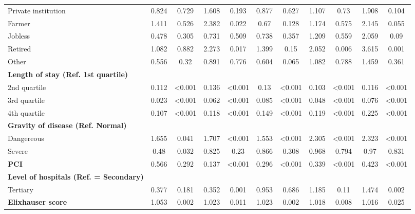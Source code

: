 \documentclass[ijerph,article,submit,moreauthors,pdftex,10pt,a4paper]{mdpi}
\theoremstyle{mdpi}
\newcounter{ex}
\newcounter{re}
\theoremstyle{mdpidefinition}
\begin{document}
\begin{landscape}
\begin{table}[ht]
{\begin{tabular}{lcccccccccc}
\quad Private institution  & 0.824 & 0.729  & 1.608 & 0.193  & 0.877 & 0.627  & 1.107 & 0.73   & 1.908 & 0.104  \\
\quad Farmer & 1.411 & 0.526  & 2.382 & 0.022  & 0.67  & 0.128  & 1.174 & 0.575  & 2.145 & 0.055  \\
\quad Jobless& 0.478 & 0.305  & 0.731 & 0.509  & 0.738 & 0.357  & 1.209 & 0.559  & 2.059 & 0.09   \\
\quad Retired& 1.082 & 0.882  & 2.273 & 0.017  & 1.399 & 0.15   & 2.052 & 0.006  & 3.615 & 0.001  \\
\quad Other  & 0.556 & 0.32   & 0.891 & 0.776  & 0.604 & 0.065  & 1.082 & 0.788  & 1.459 & 0.361  \\
\textbf{Length of stay (Ref. 1st quartile)} \\
\quad 2nd quartile & 0.112 & \textless{}0.001 & 0.136 & \textless{}0.001 & 0.13  & \textless{}0.001 & 0.103 & \textless{}0.001 & 0.116 & \textless{}0.001 \\
\quad 3rd quartile & 0.023 & \textless{}0.001 & 0.062 & \textless{}0.001 & 0.085 & \textless{}0.001 & 0.048 & \textless{}0.001 & 0.076 & \textless{}0.001 \\
\quad 4th quartile & 0.107 & \textless{}0.001 & 0.118 & \textless{}0.001 & 0.149 & \textless{}0.001 & 0.119 & \textless{}0.001 & 0.225 & \textless{}0.001 \\
\textbf{Gravity of disease (Ref. Normal)} \\
\quad Dangereous & 1.655 & 0.041  & 1.707 & \textless{}0.001 & 1.553 & \textless{}0.001 & 2.305 & \textless{}0.001 & 2.323 & \textless{}0.001 \\
\quad Severe & 0.48  & 0.032  & 0.825 & 0.23   & 0.866 & 0.308  & 0.968 & 0.794  & 0.97  & 0.831  \\
\textbf{PCI} & 0.566 & 0.292  & 0.137 & \textless{}0.001 & 0.296 & \textless{}0.001 & 0.339 & \textless{}0.001 & 0.423 & \textless{}0.001 \\
\textbf{Level of hospitals (Ref. =  Secondary)} \\
\quad Tertiary   & 0.377 & 0.181  & 0.352 & 0.001  & 0.953 & 0.686  & 1.185 & 0.11   & 1.474 & 0.002  \\
\textbf{Elixhauser score}& 1.053 & 0.002  & 1.023 & 0.011  & 1.023 & 0.002  & 1.018 & 0.008  & 1.016 & 0.025 \\
\bottomrule
\end{tabular}
}
\end{table}
\end{landscape}
\end{document}
